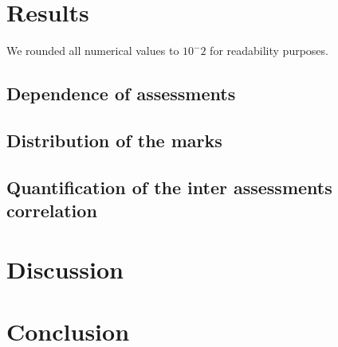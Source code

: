 \documentclass[a4paper]{article}
\begin{document}
\section{Results}
We rounded all numerical values to $10^-2$ for readability purposes.
\subsection{Dependence of assessments}

\subsection{Distribution of the marks}
\subsection{Quantification of the inter assessments correlation}
\section{Discussion}
\section{Conclusion}
\end{document}
